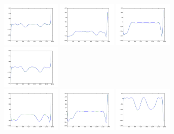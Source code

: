 \documentclass{beamer}
\begin{document}
\begin{frame}
	\begin{figure}
		\includegraphics[width=0.25\textwidth]{images/graph/motor1.png}
		\includegraphics[width=0.25\textwidth]{images/graph/motor2.png}
		\includegraphics[width=0.25\textwidth]{images/graph/motor3.png}
		\includegraphics[width=0.25\textwidth]{images/graph/motor4.png}~\\
		\includegraphics[width=0.25\textwidth]{images/graph/motor5.png}
		\includegraphics[width=0.25\textwidth]{images/graph/motor6.png}
		\includegraphics[width=0.25\textwidth]{images/graph/motor7.png}

\end{figure}
\end{frame}
\end{document}
